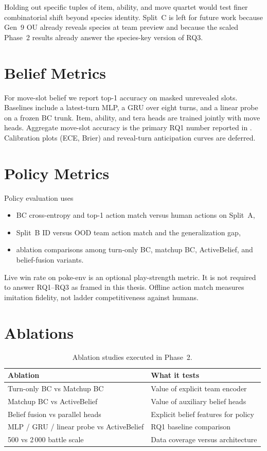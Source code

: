 Holding out specific tuples of item, ability, and move quartet would test
finer combinatorial shift beyond species identity. Split~C is left for future
work because Gen~9 OU already reveals species at team preview and because the
scaled Phase~2 results already answer the species-key version of RQ3.

\section{Belief Metrics}

For move-slot belief we report top-1 accuracy on masked unrevealed slots.
Baselines include a latest-turn MLP, a GRU over eight turns, and a linear probe
on a frozen BC trunk. Item, ability, and tera heads are trained jointly with
move heads. Aggregate move-slot accuracy is the primary RQ1 number reported in
. Calibration plots (ECE, Brier) and reveal-turn anticipation
curves are deferred.

\section{Policy Metrics}

Policy evaluation uses
\begin{itemize}
  \item BC cross-entropy and top-1 action match versus human actions on Split~A,
  \item Split~B ID versus OOD team action match and the generalization gap,
  \item ablation comparisons among turn-only BC, matchup BC, ActiveBelief, and
    belief-fusion variants.
\end{itemize}

Live win rate on poke-env is an optional play-strength metric. It is not required
to answer RQ1--RQ3 as framed in this thesis. Offline action match measures
imitation fidelity, not ladder competitiveness against humans.

\section{Ablations}

\begin{table}[ht]
  \centering
  \caption{Ablation studies executed in Phase~2.}
  \label{tab:ablations}
  \begin{tabular}{ll}
    \toprule
    Ablation & What it tests \\
    \midrule
    Turn-only BC vs Matchup BC & Value of explicit team encoder \\
    Matchup BC vs ActiveBelief & Value of auxiliary belief heads \\
    Belief fusion vs parallel heads & Explicit belief features for policy \\
    MLP / GRU / linear probe vs ActiveBelief & RQ1 baseline comparison \\
    500 vs 2\,000 battle scale & Data coverage versus architecture \\
    \bottomrule
  \end{tabular}
\end{table}

